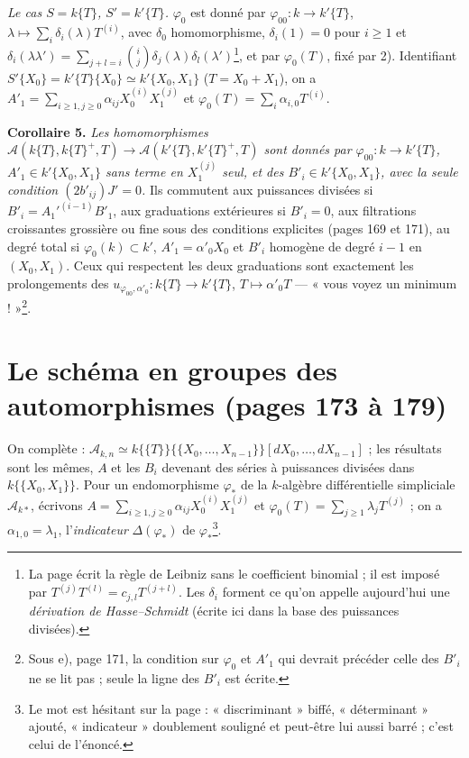 \documentclass[11pt,a4paper]{article}
\begin{document}
\emph{Le cas $S = k\{T\}$, $S' = k'\{T\}$.} $\varphi_0$ est donné par
$\varphi_{00} : k \to k'\{T\}$, $\lambda \mapsto \sum_i \delta_i(\lambda)
T^{(i)}$, avec $\delta_0$ homomorphisme, $\delta_i(1) = 0$ pour $i \geq 1$ et
$\delta_i(\lambda\lambda') = \sum_{j+l=i} \binom{i}{j} \delta_j(\lambda)
\delta_l(\lambda')$\footnote{La page écrit la règle de Leibniz sans le
coefficient binomial ; il est imposé par $T^{(j)}T^{(l)} = c_{j,l}T^{(j+l)}$.
Les $\delta_i$ forment ce qu'on appelle aujourd'hui une \emph{dérivation de
Hasse–Schmidt} (écrite ici dans la base des puissances divisées).}, et par
$\varphi_0(T)$, fixé par 2). Identifiant $S'\{X_0\} = k'\{T\}\{X_0\} \simeq
k'\{X_0, X_1\}$ ($T = X_0 + X_1$), on a $A'_1 = \sum_{i \geq 1, j \geq 0}
\alpha_{ij}X_0^{(i)}X_1^{(j)}$ et $\varphi_0(T) = \sum_i \alpha_{i,0}T^{(i)}$.

\textbf{Corollaire 5.} \emph{Les homomorphismes $\mathcal{A}(k\{T\}, k\{T\}^+, T)
\to \mathcal{A}(k'\{T\}, k'\{T\}^+, T)$ sont donnés par $\varphi_{00} : k \to
k'\{T\}$, $A'_1 \in k'\{X_0,X_1\}$ sans terme en $X_1^{(j)}$ seul, et des $B'_i
\in k'\{X_0,X_1\}$, avec la seule condition $(2b'_{ij})J' = 0$.} Ils commutent
aux puissances divisées si $B'_i = A_1'^{(i-1)}B'_1$, aux graduations
extérieures si $B'_i = 0$, aux filtrations croissantes grossière ou fine sous
des conditions explicites (pages 169 et 171), au degré total si $\varphi_0(k)
\subset k'$, $A'_1 = \alpha'_0X_0$ et $B'_i$ homogène de degré $i-1$ en
$(X_0,X_1)$. Ceux qui respectent les deux graduations sont exactement les
prolongements des $u_{\varphi_{00}, \alpha'_0} : k\{T\} \to k'\{T\}$, $T \mapsto
\alpha'_0 T$ — « vous voyez un minimum ! »\footnote{Sous e), page 171, la
condition sur $\varphi_0$ et $A'_1$ qui devrait précéder celle des $B'_i$ ne se
lit pas ; seule la ligne des $B'_i$ est écrite.}.

\section*{Le schéma en groupes des automorphismes (pages 173 à 179)}

On complète : $\widehat{\mathcal{A}}_{k,n} \simeq k\{\{T\}\}\{\{X_0,\ldots,
X_{n-1}\}\}[dX_0,\ldots,dX_{n-1}]$ ; les résultats sont les mêmes, $A$ et les
$B_i$ devenant des séries à puissances divisées dans $k\{\{X_0,X_1\}\}$. Pour un
endomorphisme $\varphi_*$ de la $k$-algèbre différentielle simpliciale
$\widehat{\mathcal{A}}_{k*}$, écrivons $A = \sum_{i \geq 1, j \geq 0}
\alpha_{ij}X_0^{(i)}X_1^{(j)}$ et $\varphi_0(T) = \sum_{j \geq 1} \lambda_j
T^{(j)}$ ; on a $\alpha_{1,0} = \lambda_1$, l'\emph{indicateur}
$\Delta(\varphi_*)$ de $\varphi_*$\footnote{Le mot est hésitant sur la page :
« discriminant » biffé, « déterminant » ajouté, « indicateur » doublement
souligné et peut-être lui aussi barré ; c'est celui de l'énoncé.}.
\end{document}
